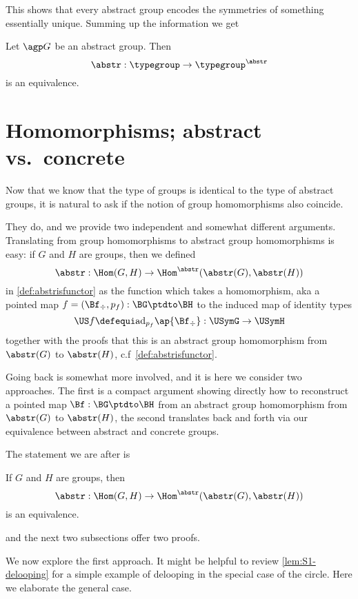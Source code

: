 This shows that every abstract group encodes the symmetries of something essentially unique.  Summing up the information we get
\begin{theorem}
  \label{thm:Groupsareidentitytypes}
  Let ${\agp G}$ be an abstract group. Then
$$\abstr:\typegroup\to\typegroup^\abstr$$ is an equivalence.
\end{theorem}

\section{Homomorphisms; abstract vs.~concrete}
\label{sec:homabsisconcr}

Now that we know that the type of groups is identical to the type of abstract groups, it is natural to ask if the notion of group homomorphisms also coincide.

They do, and we provide two independent and somewhat different arguments.  Translating from group homomorphisms to abstract group homomorphisms is easy: if $G$ and $H$ are groups, then we defined
$$\abstr:\Hom(G,H)\to\Hom^\abstr(\abstr(G),\abstr(H))$$
in \cref{def:abstrisfunctor} as the function which takes a homomorphism, aka a pointed map $f=(\Bf_\div,p_f):\BG\ptdto\BH$ to the induced map of identity types
$$\US f\defequi \mathrm{ad}_{p_f}\ap{\Bf_\div}:\USymG\to\USymH$$
 together with the proofs that this is an abstract group homomorphism from $\abstr(G)$ to $\abstr(H)$, c.f~\cref{def:abstrisfunctor}.


Going back is somewhat more involved, and it is here we consider two approaches.
The first is a compact argument showing directly how to reconstruct a pointed map $\Bf:\BG\ptdto\BH$ from an abstract group homomorphism from $\abstr(G)$ to $\abstr(H)$, the second translates back and forth via our equivalence between abstract and concrete groups.



The statement we are after is


\begin{lemma}
  \label{lem:homomabstrconcr}
  If $G$ and $H$ are groups, then
$$\abstr:\Hom(G,H)\to\Hom^\abstr(\abstr(G),\abstr(H))$$
is an equivalence.
\end{lemma}
and the next two subsections offer two proofs.



\label{sec:delooping} %
We now explore the first approach.
It might be helpful to review \cref{lem:S1-delooping}
for a simple example of delooping in the special case of the circle.
Here we elaborate the general case.


